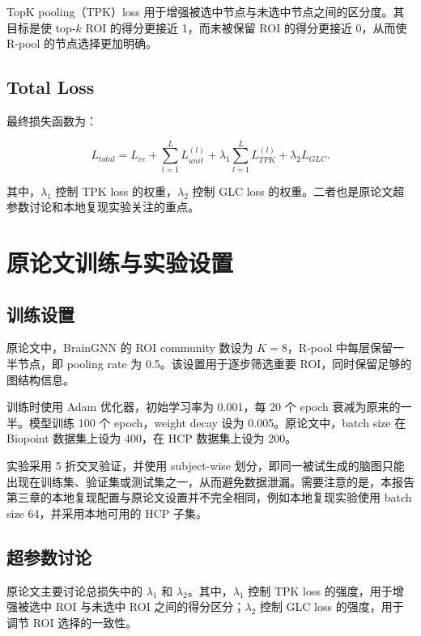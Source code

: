 TopK pooling（TPK）loss 用于增强被选中节点与未选中节点之间的区分度。其目标是使 top-$k$ ROI 的得分更接近 1，而未被保留 ROI 的得分更接近 0，从而使 R-pool 的节点选择更加明确。

\subsection{Total Loss}

最终损失函数为：

\begin{equation}
  L_{total}
  =
  L_{ce}
  +
  \sum_{l=1}^{L}L_{unit}^{(l)}
  +
  \lambda_1\sum_{l=1}^{L}L_{TPK}^{(l)}
  +
  \lambda_2L_{GLC}.
\end{equation}

其中，$\lambda_1$ 控制 TPK loss 的权重，$\lambda_2$ 控制 GLC loss 的权重。二者也是原论文超参数讨论和本地复现实验关注的重点。

\section{原论文训练与实验设置}

\subsection{训练设置}

原论文中，BrainGNN 的 ROI community 数设为 $K=8$，R-pool 中每层保留一半节点，即 pooling rate 为 0.5。该设置用于逐步筛选重要 ROI，同时保留足够的图结构信息。

训练时使用 Adam 优化器，初始学习率为 0.001，每 20 个 epoch 衰减为原来的一半。模型训练 100 个 epoch，weight decay 设为 0.005。原论文中，batch size 在 Biopoint 数据集上设为 400，在 HCP 数据集上设为 200。

实验采用 5 折交叉验证，并使用 subject-wise 划分，即同一被试生成的脑图只能出现在训练集、验证集或测试集之一，从而避免数据泄漏。需要注意的是，本报告第三章的本地复现配置与原论文设置并不完全相同，例如本地复现实验使用 batch size 64，并采用本地可用的 HCP 子集。

\subsection{超参数讨论}

原论文主要讨论总损失中的 $\lambda_1$ 和 $\lambda_2$。其中，$\lambda_1$ 控制 TPK loss 的强度，用于增强被选中 ROI 与未选中 ROI 之间的得分区分；$\lambda_2$ 控制 GLC loss 的强度，用于调节 ROI 选择的一致性。

